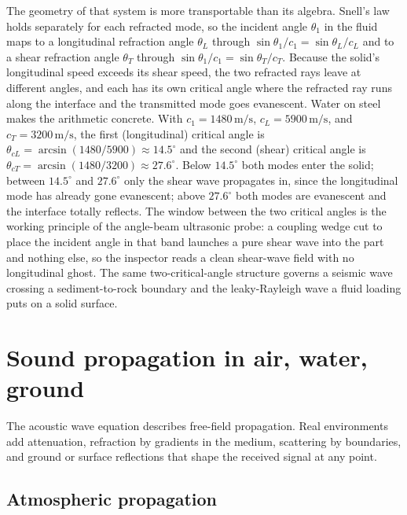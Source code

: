 The geometry of that system is more transportable than its algebra. Snell's
law holds separately for each refracted mode, so the incident angle
$\theta_1$ in the fluid maps to a longitudinal refraction angle $\theta_L$
through $\sin\theta_1/c_1 = \sin\theta_L/c_L$ and to a shear refraction
angle $\theta_T$ through $\sin\theta_1/c_1 = \sin\theta_T/c_T$. Because the
solid's longitudinal speed exceeds its shear speed, the two refracted rays
leave at different angles, and each has its own critical angle where the
refracted ray runs along the interface and the transmitted mode goes
evanescent. Water on steel makes the arithmetic concrete. With
$c_1 = 1480\,\si{\meter\per\second}$, $c_L = 5900\,\si{\meter\per\second}$,
and $c_T = 3200\,\si{\meter\per\second}$, the first (longitudinal) critical
angle is $\theta_{cL} = \arcsin(1480/5900) \approx 14.5^{\circ}$ and the
second (shear) critical angle is $\theta_{cT} = \arcsin(1480/3200) \approx
27.6^{\circ}$. Below $14.5^{\circ}$ both modes enter the solid; between
$14.5^{\circ}$ and $27.6^{\circ}$ only the shear wave propagates in, since
the longitudinal mode has already gone evanescent; above $27.6^{\circ}$ both
modes are evanescent and the interface totally reflects. The window between
the two critical angles is the working principle of the angle-beam
ultrasonic probe: a coupling wedge cut to place the incident angle in that
band launches a pure shear wave into the part and nothing else, so the
inspector reads a clean shear-wave field with no longitudinal ghost. The
same two-critical-angle structure governs a seismic wave crossing a
sediment-to-rock boundary and the leaky-Rayleigh wave a fluid loading puts
on a solid surface.

\section{Sound propagation in air, water, ground}

The acoustic wave equation describes free-field propagation. Real
environments add attenuation, refraction by gradients in the medium,
scattering by boundaries, and ground or surface reflections that
shape the received signal at any point.

\subsection{Atmospheric propagation}

